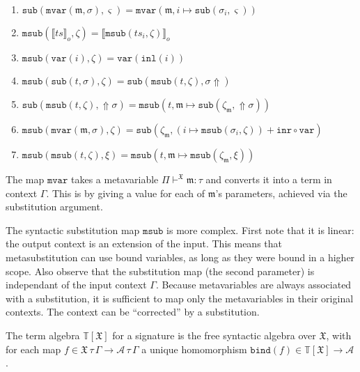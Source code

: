 \documentclass[11pt,a4paper]{article}
\newcommand*\copair[2]{{#1} + {#2}}
\newcommand*\InFamily[4]{\ensuremath{{#2} \vdash^{#1} {#3} : {#4}}}
\newcommand*\term[1]{\ensuremath{\mathbb{T}{[{#1}]}}}
\begin{document}
\begin{enumerate}
\item
  \({\mathtt{sub}(\mathtt{mvar}(\mathfrak{m},\sigma),\varsigma)} =
    {\mathtt{mvar}(\mathfrak{m},{i \mapsto {\mathtt{sub}(\sigma_i,\varsigma)}})}\)
\item
  \({\mathtt{msub}({\llbracket ts \rrbracket}_o,\zeta)} =
    {\llbracket{\mathtt{msub}(ts_i,\zeta)}\rrbracket}_o\)
\item
  \({\mathtt{msub}(\mathtt{var}(i),\zeta)} =
    {\mathtt{var}(\mathtt{inl}(i))}\)
\item
  \({\mathtt{msub}(\mathtt{sub}(t,\sigma),\zeta)} =
    {\mathtt{sub}(\mathtt{msub}(t,\zeta),{\sigma\Uparrow})}\)
\item
  \({\mathtt{sub}(\mathtt{msub}(t,\zeta),{\Uparrow\sigma})} =
    {\mathtt{msub}(t,{\mathfrak{m} \mapsto {\mathtt{sub}(\zeta_{\mathfrak{m}},{\Uparrow\sigma})}})}\)
\item
  \({\mathtt{msub}(\mathtt{mvar}(\mathfrak{m},\sigma),\zeta)} =
    {\mathtt{sub}(\zeta_{\mathfrak{m}},\copair{(i \mapsto {\mathtt{msub}(\sigma_i,\zeta)})}{\mathtt{inr}\circ\mathtt{var}})}\)
\item
  \({\mathtt{msub}(\mathtt{msub}(t,\zeta),\xi)} =
    {\mathtt{msub}(t,{\mathfrak{m} \mapsto {\mathtt{msub}(\zeta_{\mathfrak{m}},\xi)}})}\)
\end{enumerate}

The map \(\mathtt{mvar}\) takes a metavariable \InFamily{\mathfrak{X}}{\Pi}{\mathfrak{m}}{\tau} and
converts it into a term in context \(\Gamma\). This is by giving a value for each of
\(\mathfrak{m}\)'s parameters, achieved via the substitution argument.

The syntactic substitution map \(\mathtt{msub}\) is more complex. First note
that it is linear: the output context is an extension of the input. This means
that metasubstitution can use bound variables, as long as they were bound in a
higher scope. Also observe that the substitution map (the second parameter) is
independant of the input context \(\Gamma\). Because metavariables are always
associated with a substitution, it is sufficient to map only the metavariables
in their original contexts. The context can be ``corrected'' by a substitution.


The term algebra \term{\mathfrak{X}} for a signature is the free syntactic algebra over
\(\mathfrak{X}\), with for each map \(f \in {{\mathfrak{X}\,\tau\,\Gamma}\to{\mathcal{A}\,\tau\,\Gamma}}\) a unique homomorphism
\(\mathtt{bind}(f) \in {\term{\mathfrak{X}} \to \mathcal{A}}\).
\end{document}
